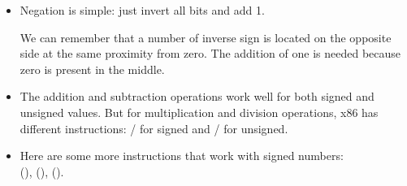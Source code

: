 \begin{itemize}
\label{sec:signednumbers:negation}
\item Negation is simple: just invert all bits and add 1.

We can remember that a number of inverse sign is located on the opposite side at the same proximity from zero.
The addition of one is needed because zero is present in the middle.

\item 
	The addition and subtraction operations work well for both signed and unsigned values.
	But for multiplication and division operations, x86 has different instructions:
	/ for signed and / for unsigned.
\item
	Here are some more instructions that work with signed numbers:\\
	 (),  (),  ().
\end{itemize}




